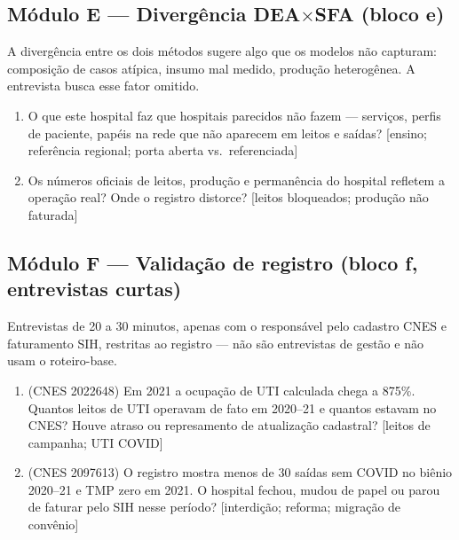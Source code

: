 \documentclass[12pt,a4paper]{article}
\newcommand{\achado}[1]{%
  \noindent{\small\itshape\textcolor{black!60}{Achado que a pergunta
  testa: #1}}\par\smallskip}
\begin{document}
\subsection{Módulo E --- Divergência DEA$\times$SFA (bloco e)}

A divergência entre os dois métodos sugere algo que os modelos não
capturam: composição de casos atípica, insumo mal medido, produção
heterogênea. A entrevista busca esse fator omitido.

\begin{enumerate}[itemsep=2pt]
  \item O que este hospital faz que hospitais parecidos não fazem --- serviços, perfis de paciente, papéis na rede que não aparecem em leitos e saídas? [ensino; referência regional; porta aberta vs.\ referenciada]
  \par\nopagebreak\achado{DEA e SFA discordam fortemente sobre este hospital; a explicação provável é dimensão de produto ou insumo que nenhum dos dois modelos mede.}
  \item Os números oficiais de leitos, produção e permanência do hospital refletem a operação real? Onde o registro distorce? [leitos bloqueados; produção não faturada]
  \par\nopagebreak\achado{a divergência entre métodos também pode ser artefato de medida; a pergunta verifica a qualidade do dado antes de interpretar o resto da entrevista.}
\end{enumerate}

\subsection{Módulo F --- Validação de registro (bloco f, entrevistas curtas)}

Entrevistas de 20 a 30 minutos, apenas com o responsável pelo cadastro
CNES e faturamento SIH, restritas ao registro --- não são entrevistas de
gestão e não usam o roteiro-base.

\begin{enumerate}[itemsep=2pt]
  \item (CNES 2022648) Em 2021 a ocupação de UTI calculada chega a 875\%. Quantos leitos de UTI operavam de fato em 2020--21 e quantos estavam no CNES? Houve atraso ou represamento de atualização cadastral? [leitos de campanha; UTI COVID]
  \par\nopagebreak\achado{ocupação acima de 100\% em escala implica denominador (leitos CNES) menor que a operação real; a resposta define como tratar as observações extremas de 2020--21.}
  \item (CNES 2097613) O registro mostra menos de 30 saídas sem COVID no biênio 2020--21 e TMP zero em 2021. O hospital fechou, mudou de papel ou parou de faturar pelo SIH nesse período? [interdição; reforma; migração de convênio]
  \par\nopagebreak\achado{as duas observações desse CNES já são tratadas como denominador frágil e excluídas dos desfechos; a resposta confirma ou corrige esse tratamento.}
\end{enumerate}
\end{document}
